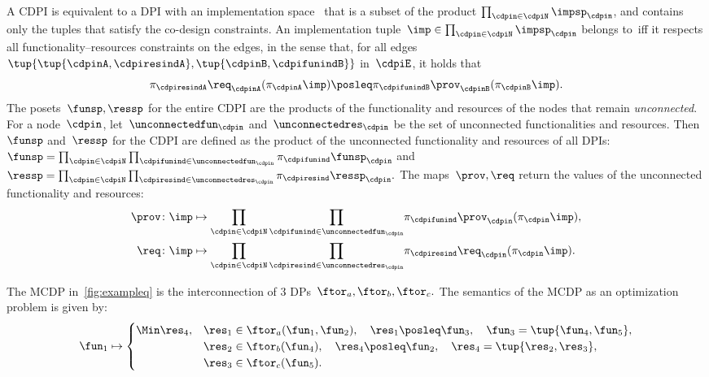 A CDPI is equivalent to a DPI with an implementation space~\impsp
that is a subset of the product $\prod_{\cdpin\in\cdpiN}\impsp_{\cdpin}$,
and contains only the tuples that satisfy the co-design constraints.
An implementation tuple~$\imp\in\prod_{\cdpin\in\cdpiN}\impsp_{\cdpin}$
belongs to~\impsp iff it respects all functionality--resources
constraints on the edges, in the sense that, for all edges~$\tup{\tup{ \cdpinA,\cdpiresindA} ,\tup{\cdpinB,\cdpifunindB}}$
in~$\cdpiE$, it holds that
\begin{equation*}
    \pi_{\cdpiresindA}\req_{\cdpinA}(\pi_{\cdpinA}\imp)\posleq\pi_{\cdpifunindB}\prov_{\cdpinB}(\pi_{\cdpinB}\imp).
\end{equation*}
The posets~$\funsp,\ressp$ for the entire CDPI are the products
of the functionality and resources of the nodes that remain \emph{unconnected}.
For a node~$\cdpin$, let~$\unconnectedfun_{\cdpin}$ and~$\unconnectedres_{\cdpin}$
be the set of unconnected functionalities and resources.
Then~$\funsp$ and~$\ressp$ for the CDPI are defined as the product of the unconnected functionality and resources of all DPIs:
~$\funsp=\prod_{\cdpin\in\cdpiN}\prod_{\cdpifunind\in\unconnectedfun_{\cdpin}}\pi_{\cdpifunind}\funsp_{\cdpin}$
and~$\ressp=\prod_{\cdpin\in\cdpiN}\prod_{\cdpiresind\in\unconnectedres_{\cdpin}}\pi_{\cdpiresind}\ressp_{\cdpin}.$
The maps~$\prov,\req$ return the values of the unconnected functionality
and resources:
\begin{equation*}
\begin{aligned}
    \prov\colon \imp & \mapsto{\scriptstyle {\displaystyle \prod_{\cdpin\in\cdpiN}\prod_{\cdpifunind\in\unconnectedfun_{\cdpin}}}}\pi_{\cdpifunind}\prov_{\cdpin}(\pi_{\cdpin}\imp),\\
    \req\colon \imp & \mapsto{\displaystyle \prod_{\cdpin\in\cdpiN}\prod_{\cdpiresind\in\unconnectedres_{\cdpin}}}\pi_{\cdpiresind}\req_{\cdpin}(\pi_{\cdpin}\imp).
\end{aligned}
\end{equation*}


\begin{example}
    The MCDP in~\cref{fig:exampleq} is the interconnection of 3
    DPs~$\ftor_{a},\ftor_{b},\ftor_{c}.$ The semantics of the MCDP as
    an optimization problem is given by:
    \begin{equation*}
    \fun_1\mapsto \begin{cases}
                      \Min \res_4,& \res_1\in \ftor_a(\fun_1,\fun_2),\quad \res_1\posleq \fun_3, \quad \fun_3=\tup{\fun_4,\fun_5},\\
                      &\res_2\in \ftor_b(\fun_4),\quad \res_4\posleq \fun_2,\quad \res_4=\tup{\res_2,\res_3},\\
                      &\res_3\in \ftor_c(\fun_5).
\end{cases}
\end{equation*}
\end{example}

